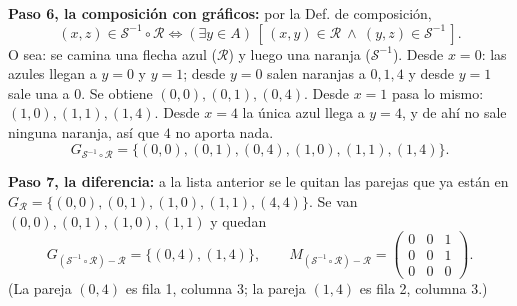 \documentclass[11pt]{article}
\newcommand{\R}{\mathcal{R}}
\newcommand{\Sr}{\mathcal{S}}
\begin{document}
\begin{explica}
\textbf{Paso 6, la composición con gráficos:} por la Def. de composición,
\[
(x,z)\in\Sr^{-1}\circ\R\iff(\exists y\in A)\,[\,(x,y)\in\R\ \wedge\ (y,z)\in\Sr^{-1}\,].
\]
O sea: se camina una flecha azul ($\R$) y luego una naranja ($\Sr^{-1}$). Desde $x=0$: las azules llegan a $y=0$ y $y=1$; desde $y=0$ salen naranjas a $0,1,4$ y desde $y=1$ sale una a $0$. Se obtiene $(0,0),(0,1),(0,4)$. Desde $x=1$ pasa lo mismo: $(1,0),(1,1),(1,4)$. Desde $x=4$ la única azul llega a $y=4$, y de ahí no sale ninguna naranja, así que $4$ no aporta nada.
\[G_{\Sr^{-1}\circ\R}=\{(0,0),(0,1),(0,4),(1,0),(1,1),(1,4)\}.\]

\textbf{Paso 7, la diferencia:} a la lista anterior se le quitan las parejas que ya están en $G_\R=\{(0,0),(0,1),(1,0),(1,1),(4,4)\}$. Se van $(0,0),(0,1),(1,0),(1,1)$ y quedan
\[
G_{(\Sr^{-1}\circ\R)-\R}=\{(0,4),(1,4)\},\qquad M_{(\Sr^{-1}\circ\R)-\R}=\begin{pmatrix}0&0&1\\0&0&1\\0&0&0\end{pmatrix}.
\]
(La pareja $(0,4)$ es fila 1, columna 3; la pareja $(1,4)$ es fila 2, columna 3.)
\end{explica}
\end{document}
